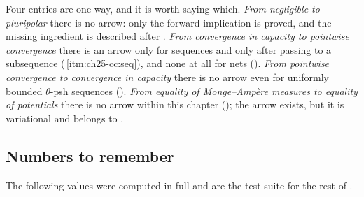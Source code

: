Four entries are one-way, and it is worth saying which.  \emph{From
negligible to pluripolar} there is no arrow: only the forward implication is
proved, and the missing ingredient is described after
.  \emph{From convergence in capacity to
pointwise convergence} there is an arrow only for sequences and only after
passing to a subsequence
(\,\cref{itm:ch25-cc:seq}), and none at
all for nets ().  \emph{From pointwise
convergence to convergence in capacity} there is no arrow even for uniformly
bounded $\theta$-psh sequences
().  \emph{From equality of
Monge--Amp\`ere measures to equality of potentials} there is no arrow within
this chapter (); the arrow exists, but it is
variational and belongs to
.

\subsection{Numbers to remember}
\label{sec:ch25-dict-numbers}

The following values were computed in full and are the test suite for the
rest of .

